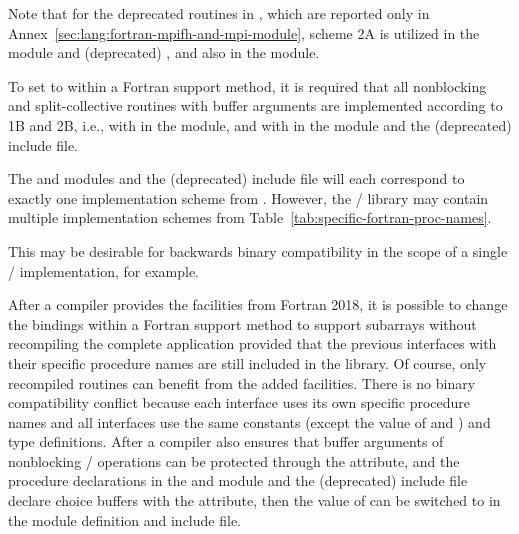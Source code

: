 Note that for the deprecated routines in
,
which are reported only in
Annex~\ref{sec:lang:fortran-mpifh-and-mpi-module},
scheme 2A is utilized in the  module and (deprecated) ,
and also in the  module.

To set  to 
within a Fortran support method, it is required that
all nonblocking and split-collective routines with buffer arguments
are implemented according to 1B and 2B, i.e.,
with  in the  module,
and with  in the  module
and the (deprecated)  include file.

The  and  modules and the (deprecated) 
include file
will each correspond to exactly one implementation scheme from
.
However, the \MPI/ library may contain multiple implementation schemes from
Table~\ref{tab:specific-fortran-proc-names}.
\begin{implementors}
This may be desirable for backwards binary compatibility
in the scope of a single \MPI/ implementation, for example.
\end{implementors}

\begin{rationale}
After a compiler provides the facilities
 from Fortran 2018,
it is possible to change the bindings within a Fortran support method
to support subarrays
without recompiling the complete application
provided that the previous interfaces
with their specific procedure names are still included in the library.
Of course, only recompiled routines can benefit from the
added facilities.
There is no binary compatibility conflict
because each interface uses its own
specific procedure names and
all interfaces use the same constants
(except the value of  and )
and type definitions.
After a compiler also ensures that buffer arguments of nonblocking \MPI/ operations
can be protected through the  attribute,
and the procedure declarations in the  and  module
and the (deprecated)  include file declare choice buffers
with the  attribute, then
the value of  can be switched to 
in the module definition and include file.
\end{rationale}

